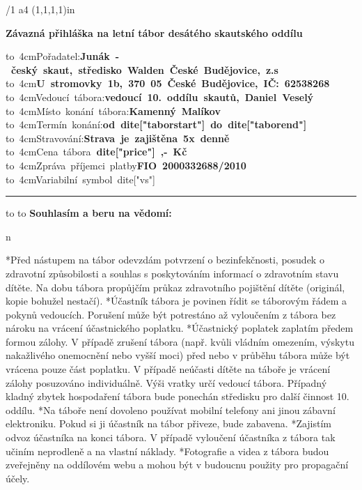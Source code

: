 
\typosize[11/13]
\margins/1 a4 (1,1,1,1)in
\chyph
\fontfam[timesroman]
\nopagenumbers

\centerline{
\typosize[20/13]
\bf
Závazná přihláška na letní tábor desátého skautského oddílu
}
\vskip 1cm
\hbox{\hbox to 4cm{Pořadatel:\hfil}\bf Junák - český skaut, středisko Walden České Budějovice, z.s}
\hbox{\hbox to 4cm{\hfil}\bf U stromovky 1b, 370 05 České Budějovice, IČ: 62538268}
\hbox{\hbox to 4cm{Vedoucí tábora:\hfil}\bf vedoucí 10. oddílu skautů, Daniel Veselý}
\hbox{\hbox to 4cm{Místo konání tábora:\hfil}\bf Kamenný Malíkov}
\hbox{\hbox to 4cm{Termín konání:\hfil}\bf od {{dite["taborstart"]}} do {{dite["taborend"]}}}
\hbox{\hbox to 4cm{Stravování:\hfil}\bf Strava je zajištěna 5x denně}
\hbox{\hbox to 4cm{Cena tábora\hfil}\bf {{ dite["price"] }},- Kč}
\hbox{\hbox to 4cm{Zpráva příjemci platby\hfil}\bf FIO 2000332688/2010}
\hbox{\hbox to 4cm{Variabilní symbol\hfil}{{ dite["vs"] }}}%

\bigskip
\hrule
\bigskip

{
\typosize[11/18]
\hbox to 
\hbox to 
}
\smallskip
\noindent
{\bf Souhlasím a beru na vědomí:}
{
\begitems \style n
\leftskip=1cm
\rightskip=0cm
\parskip=5pt
\par
*Před nástupem na tábor odevzdám potvrzení o bezinfekčnosti, posudek o zdravotní způsobilosti a souhlas s poskytováním informací o zdravotním stavu dítěte. 
Na dobu tábora propůjčím průkaz zdravotního pojištění dítěte (originál, kopie bohužel nestačí).
*Účastník tábora je povinen řídit se táborovým řádem a
pokynů vedoucích. Porušení může být potrestáno až
vyloučením z tábora bez nároku na vrácení účastnického
poplatku.
*Účastnický poplatek zaplatím předem formou zálohy. V
případě zrušení tábora (např. kvůli vládním omezením,
výskytu nakažlivého onemocnění nebo vyšší moci) před nebo
v průběhu tábora může být vrácena pouze část poplatku. V
případě neúčasti dítěte na táboře je vrácení zálohy posuzováno individuálně. Výši vratky určí vedoucí tábora.
Případný kladný zbytek hospodaření tábora bude ponechán středisku pro další činnost 10. oddílu.
*Na táboře není dovoleno používat mobilní telefony ani 
jinou zábavní elektroniku. Pokud si ji účastník na tábor 
přiveze, bude zabavena.
*Zajistím odvoz účastníka na konci tábora. V případě 
vyloučení účastníka z tábora tak učiním neprodleně a na 
vlastní náklady.
*Fotografie a videa z tábora budou zveřejněny na oddílovém 
webu a mohou být v budoucnu použity pro propagační účely.
\enditems
}


